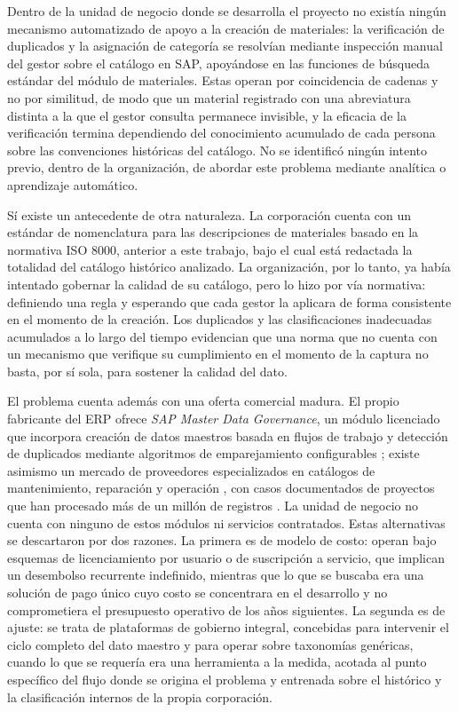 Dentro de la unidad de negocio donde se desarrolla el proyecto no existía ningún mecanismo automatizado de apoyo a la creación de materiales: la verificación de duplicados y la asignación de categoría se resolvían mediante inspección manual del gestor sobre el catálogo en SAP, apoyándose en las funciones de búsqueda estándar del módulo de materiales. Estas operan por coincidencia de cadenas y no por similitud, de modo que un material registrado con una abreviatura distinta a la que el gestor consulta permanece invisible, y la eficacia de la verificación termina dependiendo del conocimiento acumulado de cada persona sobre las convenciones históricas del catálogo. No se identificó ningún intento previo, dentro de la organización, de abordar este problema mediante analítica o aprendizaje automático.

Sí existe un antecedente de otra naturaleza. La corporación cuenta con un estándar de nomenclatura para las descripciones de materiales basado en la normativa ISO 8000, anterior a este trabajo, bajo el cual está redactada la totalidad del catálogo histórico analizado. La organización, por lo tanto, ya había intentado gobernar la calidad de su catálogo, pero lo hizo por vía normativa: definiendo una regla y esperando que cada gestor la aplicara de forma consistente en el momento de la creación. Los duplicados y las clasificaciones inadecuadas acumulados a lo largo del tiempo evidencian que una norma que no cuenta con un mecanismo que verifique su cumplimiento en el momento de la captura no basta, por sí sola, para sostener la calidad del dato.

El problema cuenta además con una oferta comercial madura. El propio fabricante del ERP ofrece \textit{SAP Master Data Governance}, un módulo licenciado que incorpora creación de datos maestros basada en flujos de trabajo y detección de duplicados mediante algoritmos de emparejamiento configurables \cite{sapmdg}; existe asimismo un mercado de proveedores especializados en catálogos de mantenimiento, reparación y operación \cite{verdantis}, con casos documentados de proyectos que han procesado más de un millón de registros \cite{ey}. La unidad de negocio no cuenta con ninguno de estos módulos ni servicios contratados. Estas alternativas se descartaron por dos razones. La primera es de modelo de costo: operan bajo esquemas de licenciamiento por usuario o de suscripción a servicio, que implican un desembolso recurrente indefinido, mientras que lo que se buscaba era una solución de pago único cuyo costo se concentrara en el desarrollo y no comprometiera el presupuesto operativo de los años siguientes. La segunda es de ajuste: se trata de plataformas de gobierno integral, concebidas para intervenir el ciclo completo del dato maestro y para operar sobre taxonomías genéricas, cuando lo que se requería era una herramienta a la medida, acotada al punto específico del flujo donde se origina el problema y entrenada sobre el histórico y la clasificación internos de la propia corporación.

